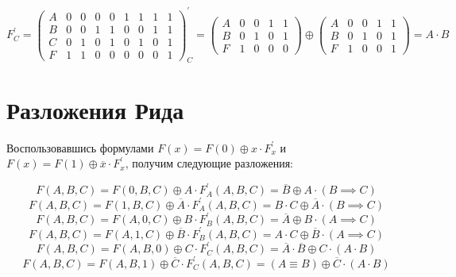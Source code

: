 \documentclass[a4paper,10pt]{article} %
\begin{document}
	\begin{equation}
		F^{\prime}_{C} = 
		\left(
		\begin{smallmatrix}
			A & 0 & 0 & 0 & 0 & 1 & 1 & 1 & 1 \\
			B & 0 & 0 & 1 & 1 & 0 & 0 & 1 & 1 \\
			C & 0 & 1 & 0 & 1 & 0 & 1 & 0 & 1 \\
			F & 1 & 1 & 0 & 0 & 0 & 0 & 0 & 1
		\end{smallmatrix}
		\right)^{\prime}_{C} =
		\left(
		\begin{smallmatrix}
			A & 0 & 0 & 1 & 1 \\
			B & 0 & 1 & 0 & 1 \\
			F & 1 & 0 & 0 & 0
		\end{smallmatrix}
		\right) \oplus
		\left(
		\begin{smallmatrix}
			A & 0 & 0 & 1 & 1 \\
			B & 0 & 1 & 0 & 1 \\
			F & 1 & 0 & 0 & 1 
		\end{smallmatrix}
		\right)
		= A \cdot B
	\end{equation}

	
	\section{Разложения Рида}
	Воспользовавшись формулами $F(x) = F(0) \oplus x \cdot F_{x}^{\prime}$ 
	и $F(x) = F(1) \oplus \overline{x} \cdot F_{x}^{\prime}$, получим следующие
	разложения:
	
	\begin{equation}
		F(A, B, C) = F(0, B, C) \oplus A \cdot F_{A}^{\prime}(A, B, C) =
		\overline{B} \oplus A \cdot (B \implies C) 
	\end{equation}
	\begin{equation}
		F(A, B, C) = F(1, B, C) \oplus \overline{A} \cdot F_{A}^{\prime}(A, B, C) =
		B \cdot C \oplus \overline{A} \cdot (B \implies C)
	\end{equation}
	\begin{equation}
		F(A, B, C) = F(A, 0, C) \oplus B \cdot F_{B}^{\prime}(A, B, C) =
		\overline{A} \oplus B \cdot (A \implies C)
	\end{equation}
	\begin{equation}
		F(A, B, C) = F(A, 1, C) \oplus \overline{B} \cdot F_{B}^{\prime}(A, B, C) =
		A \cdot C \oplus \overline{B} \cdot (A \implies C)
	\end{equation}
	\begin{equation}
		F(A, B, C) = F(A, B, 0) \oplus C \cdot F_{C}^{\prime}(A, B, C) =
		\overline{A} \cdot \overline{B} \oplus C \cdot (A \cdot B)
	\end{equation}
	\begin{equation}
		F(A, B, C) = F(A, B, 1) \oplus \overline{C} \cdot F_{C}^{\prime}(A, B, C) =
		(A \equiv B) \oplus \overline{C} \cdot (A \cdot B) 
	\end{equation}
\end{document}
